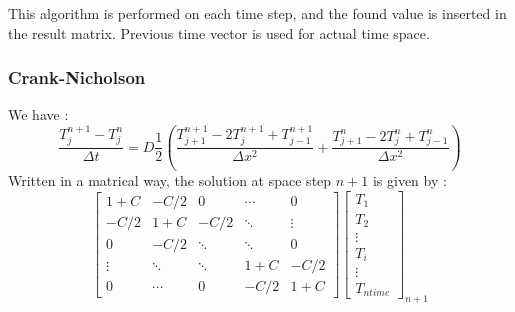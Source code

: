 \documentclass{article}
\begin{document}
                    This algorithm is performed on each time step, and the found value is inserted in the 
                    result matrix. Previous time vector is used for actual time space.



                    \subsubsection{Crank-Nicholson}
                        We have :
                        \begin{equation}
                            \frac{T_{j}^{n+1} - T_{j}^n}{\Delta t} = D\frac{1}{2} (\frac{T_{j+1}^{n+1}- 2T_{j}^{n+1} + T_{j-1}^{n+1}}{\Delta x^2}+\frac{T_{j+1}^{n}- 2T_{j}^{n} + T_{j-1}^{n}}{\Delta x^2})
                        \end{equation}
                        Written in a matrical way, the solution at space step $n+1$ is given by :
                        \begin{equation}
                            \begin{bmatrix}
                                1+C    & -C/2   & 0     & \cdots & 0 \\
                                -C/2   & 1+C    & -C/2   & \ddots & \vdots \\
                                0      & -C/2   & \ddots & \ddots & 0 \\
                                \vdots & \ddots & \ddots & 1+C   & -C/2\\
                                0      & \cdots & 0      & -C/2   & 1+C
                            \end{bmatrix}
                            \begin{bmatrix}
                                T_{1} \\
                                T_{2} \\
                                \vdots \\
                                T_{i} \\
                                \vdots \\
                                T_{ntime}
                            \end{bmatrix}_{n+1}
                            \label{eq:crank}
                        \end{equation}
\end{document}
